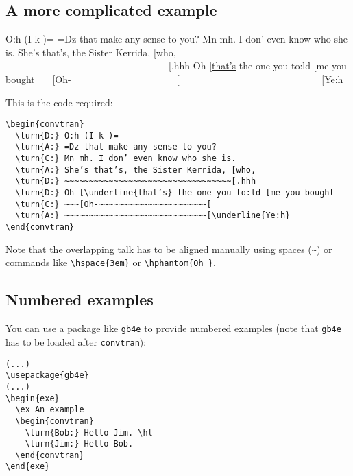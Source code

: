 \documentclass[a4paper]{article}
\begin{document}
\subsection{A more complicated example}
\begin{convtran}
   O:h (I k-)=
   =Dz that make any sense to you?
   Mn mh. I don’ even know who she is.
   She’s that’s, the Sister Kerrida, [who,
   ~~~~~~~~~~~~~~~~~~~~~~~~~~~~~~~~~~[.hhh
   Oh [\underline{that’s} the one you to:ld [me you bought
   ~~~[Oh-~~~~~~~~~~~~~~~~~~~~~~[
   ~~~~~~~~~~~~~~~~~~~~~~~~~~~~~[\underline{Ye:h}
\end{convtran}
This is the code required:
\begin{verbatim}
\begin{convtran}
  \turn{D:} O:h (I k-)=
  \turn{A:} =Dz that make any sense to you?
  \turn{C:} Mn mh. I don’ even know who she is.
  \turn{A:} She’s that’s, the Sister Kerrida, [who,
  \turn{D:} ~~~~~~~~~~~~~~~~~~~~~~~~~~~~~~~~~~[.hhh
  \turn{D:} Oh [\underline{that’s} the one you to:ld [me you bought
  \turn{C:} ~~~[Oh-~~~~~~~~~~~~~~~~~~~~~~[
  \turn{A:} ~~~~~~~~~~~~~~~~~~~~~~~~~~~~~[\underline{Ye:h}
\end{convtran}
\end{verbatim}
Note that the overlapping talk has to be aligned manually using spaces
(\verb!~!) or commands like \verb!\hspace{3em}! or \verb!\hphantom{Oh }!.

\subsection{Numbered examples}
You can use a package like \verb!gb4e! to provide numbered examples (note that \verb!gb4e! has to be loaded after \verb!convtran!):
\begin{verbatim}
(...)
\usepackage{gb4e}
(...)
\begin{exe}
  \ex An example
  \begin{convtran}
    \turn{Bob:} Hello Jim. \hl
    \turn{Jim:} Hello Bob.
  \end{convtran}
\end{exe}
\end{verbatim}
\end{document}
